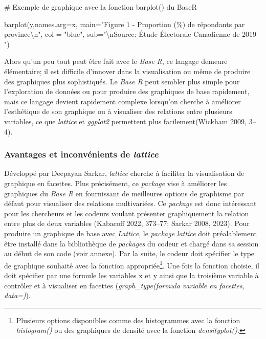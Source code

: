 \documentclass[
  letterpaper,
]{scrbook}
\newenvironment{Shaded}{\begin{snugshade}}{\end{snugshade}}
\newcommand{\AttributeTok}[1]{\textcolor[rgb]{0.40,0.45,0.13}{#1}}
\newcommand{\CommentTok}[1]{\textcolor[rgb]{0.37,0.37,0.37}{#1}}
\newcommand{\FunctionTok}[1]{\textcolor[rgb]{0.28,0.35,0.67}{#1}}
\newcommand{\NormalTok}[1]{\textcolor[rgb]{0.00,0.23,0.31}{#1}}
\newcommand{\SpecialCharTok}[1]{\textcolor[rgb]{0.37,0.37,0.37}{#1}}
\newcommand{\StringTok}[1]{\textcolor[rgb]{0.13,0.47,0.30}{#1}}
\begin{document}
\begin{Shaded}
\begin{Highlighting}[]
\CommentTok{\# Exemple de graphique avec la fonction barplot() du BaseR}

\FunctionTok{barplot}\NormalTok{(y,}\AttributeTok{names.arg=}\NormalTok{x,}
 \AttributeTok{main=}\StringTok{"Figure 1 {-} Proportion (\%) de répondants par province}\SpecialCharTok{\textbackslash{}n}\StringTok{"}\NormalTok{,}
 \AttributeTok{col =} \StringTok{"blue"}\NormalTok{,}
 \AttributeTok{sub=}\StringTok{"}\SpecialCharTok{\textbackslash{}n}\StringTok{Source: Étude Électorale Canadienne de 2019                                                "}\NormalTok{) }
\end{Highlighting}
\end{Shaded}

Alors qu'un peu tout peut être fait avec le \emph{Base R}, ce langage
demeure élémentaire; il est difficile d'innover dans la visualisation ou
même de produire des graphiques plus sophistiqués. Le \emph{Base R} peut
sembler plus simple pour l'exploration de données ou pour produire des
graphiques de base rapidement, mais ce langage devient rapidement
complexe lorsqu'on cherche à améliorer l'esthétique de son graphique ou
à visualiser des relations entre plusieurs variables, ce que
\emph{lattice} et \emph{ggplot2} permettent plus facilement(Wickham
2009, 3--4).

\hypertarget{avantages-et-inconvuxe9nients-de-lattice}{%
\subsubsection{\texorpdfstring{Avantages et inconvénients de
\emph{lattice}}{Avantages et inconvénients de lattice}}\label{avantages-et-inconvuxe9nients-de-lattice}}

Développé par Deepayan Sarkar, \emph{lattice} cherche à faciliter la
visualisation de graphique en facettes. Plus précisément, ce
\emph{package} vise à améliorer les graphiques du \emph{Base R} en
fournissant de meilleures options de graphisme par défaut pour
visualiser des relations multivariées. Ce \emph{package} est donc
intéressant pour les chercheurs et les codeurs voulant présenter
graphiquement la relation entre plus de deux variables (Kabacoff 2022,
373--77; Sarkar 2008, 2023). Pour produire un graphique de base avec
\emph{Lattice}, le \emph{package lattice} doit préalablement être
installé dans la bibliothèque de \emph{packages} du codeur et chargé
dans sa session au début de son code (voir annexe). Par la suite, le
codeur doit spécifier le type de graphique souhaité avec la fonction
appropriée\footnote{Plusieurs options disponibles comme des histogrammes
  avec la fonction \emph{histogram()} ou des graphiques de densité avec
  la fonction \emph{densityplot()}.}. Une fois la fonction choisie, il
doit spécifier par une formule les variables x et y ainsi que la
troisième variable à contrôler et à visualiser en facettes
(\emph{graph\_type(formula \textbar{} variable en facettes, data=)}).
\end{document}
